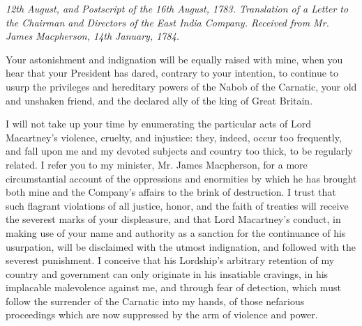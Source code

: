 \PRLsep

\textit{12th August, and Postscript of the 16th August, 1783. Translation of a Letter to the Chairman and Directors of the East India Company. Received from Mr. James Macpherson, 14th January, 1784.}
\vspace{0.3cm}

Your astonishment and indignation will be equally raised with mine, when you hear that your President has dared, contrary to your intention, to continue to usurp the privileges and hereditary powers of the Nabob of the Carnatic, your old and unshaken friend, and the declared ally of the king of Great Britain.

I will not take up your time by enumerating the particular acts of Lord Macartney's violence, cruelty, and injustice: they, indeed, occur too frequently, and fall upon me and my devoted subjects and country too thick, to be regularly related. I refer you to my minister, Mr. James Macpherson, for a more circumstantial account of the oppressions and enormities by which he has brought both mine and the Company's affairs to the brink of destruction. I trust that such flagrant violations of all justice, honor, and the faith of treaties will receive the severest marks of your displeasure, and that Lord Macartney's conduct, in making use of your name and authority as a sanction for the continuance of his usurpation, will be disclaimed with the utmost indignation, and followed with the severest punishment. I conceive that his Lordship's arbitrary retention of my country and government can only originate in his insatiable cravings, in his implacable malevolence against me, and through fear of detection, which must follow the surrender of the Carnatic into my hands, of those nefarious proceedings which are now suppressed by the arm of violence and power.


